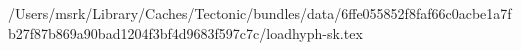 /Users/msrk/Library/Caches/Tectonic/bundles/data/6ffe055852f8faf66c0acbe1a7fb27f87b869a90bad1204f3bf4d9683f597c7c/loadhyph-sk.tex